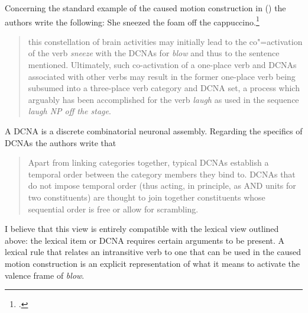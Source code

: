 \begin{exe}
\begin{xlist}[iv.]
\begin{exe}
\begin{xlist}[iv.]
Concerning the standard example of the caused motion construction in () the authors write the
following:
\ea
She sneezed the foam off the cappuccino.\footnote{
.
}
\z
\begin{quote}
  this constellation of brain activities may initially lead to the co"=activation of the verb \emph{sneeze}
  with the DCNAs for \emph{blow} and thus to the sentence mentioned. Ultimately, such co-activation of a
  one-place verb and DCNAs associated with other verbs may result in the former one-place verb being
  subsumed into a three-place verb category and DCNA set, a process which arguably has been
  accomplished for the verb \emph{laugh} as used in the sequence \emph{laugh NP off the stage}. \citep*{PCShandbookCxG}
\end{quote}
A DCNA is a discrete combinatorial neuronal assembly. Regarding the specifics of DCNAs the authors write that 
\begin{quote}
Apart from linking categories together, typical DCNAs establish a temporal order between the
category members they bind to. DCNAs that do not impose temporal order (thus acting, in principle,
as AND units for two constituents) are thought to join together constituents whose sequential order
is free or allow for scrambling. \citep*[]{PCShandbookCxG}
\end{quote}
I believe that this view is entirely compatible with the lexical view outlined above: the lexical
item or DCNA requires certain arguments to be present. A lexical rule that relates an intransitive verb
to one that can be used in the caused motion construction is an explicit representation of what it
means to activate the valence frame of \emph{blow}.


\end{xlist}
\end{exe}
\end{xlist}
\end{exe}
